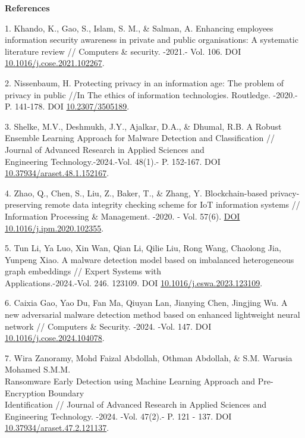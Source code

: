 \begin{center}
{\bfseries References}
\end{center}

\begin{references}
1. Khando, K., Gao, S., Islam, S. M., \& Salman, A. Enhancing employees
information security awareness in private and public organisations: A
systematic literature review // Computers \& security. -2021.- Vol.
106. DOI
\href{https://doi.org/10.1016/j.cose.2021.102267}{10.1016/j.cose.2021.102267}.

2. Nissenbaum, H. Protecting privacy in an information age: The problem
of privacy in public //In The ethics of information technologies.
Routledge. -2020.- P. 141-178. DOI
\href{https://doi.org/10.2307/3505189}{10.2307/3505189}.

3. Shelke, M.V., Deshmukh, J.Y., Ajalkar, D.A., \& Dhumal, R.B. A Robust
Ensemble Learning Approach for Malware Detection and Classification //
Journal of Advanced Research in Applied Sciences and \\Engineering
Technology.-2024.-Vol. 48(1).- P. 152-167. DOI \href{https://doi.org/10.37934/araset.48.1.152167}{10.37934/araset.48.1.152167}.

4. Zhao, Q., Chen, S., Liu, Z., Baker, T., \& Zhang, Y. Blockchain-based
privacy-preserving remote data integrity checking scheme for IoT
information systems // Information Processing \& Management. -2020. -
Vol. 57(6). \href{https://doi.org/10.1016/j.ipm.2020.102355}{DOI
10.1016/j.ipm.2020.102355}.

5. Tun Li, Ya Luo, Xin Wan, Qian Li, Qilie Liu, Rong Wang, Chaolong Jia,
Yunpeng Xiao. A malware detection model based on imbalanced
heterogeneous graph embeddings // Expert Systems with
\\Applications.-2024.-Vol. 246. 123109. DOI
\href{https://doi.org/10.1016/j.eswa.2023.123109}{10.1016/j.eswa.2023.123109}.

6. Caixia Gao, Yao Du, Fan Ma, Qiuyan Lan, Jianying Chen, Jingjing Wu. A
new adversarial malware detection method based on enhanced lightweight
neural network // Computers \& Security. -2024. -Vol. 147. DOI
\href{https://doi.org/10.1016/j.cose.2024.104078}{10.1016/j.cose.2024.104078}.

7. Wira Zanoramy, Mohd Faizal Abdollah, Othman Abdollah, \& S.M. Warusia
Mohamed S.M.M. \\Ransomware Early Detection using Machine Learning
Approach and Pre-Encryption Boundary \\Identification // Journal of
Advanced Research in Applied Sciences and Engineering Technology.
-2024. -Vol. 47(2).- P. 121 - 137. DOI
\href{https://doi.org/10.37934/araset.47.2.121137}{10.37934/araset.47.2.121137}.


\end{references}
